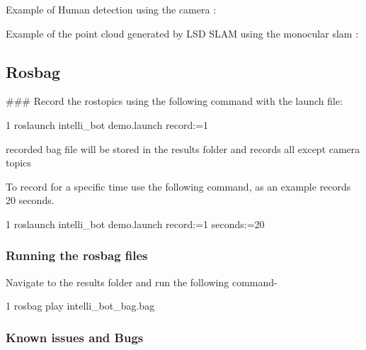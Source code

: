 Example of Human detection using the camera \+: 

Example of the point cloud generated by L\+SD S\+L\+AM using the monocular slam \+: 

\subsection*{Rosbag}

\#\#\# Record the rostopics using the following command with the launch file\+: 
\begin{DoxyCode}
1 roslaunch intelli\_bot demo.launch record:=1
\end{DoxyCode}


recorded bag file will be stored in the results folder and records all except camera topics

To record for a specific time use the following command, as an example records 20 seconds. 
\begin{DoxyCode}
1 roslaunch intelli\_bot demo.launch record:=1 seconds:=20
\end{DoxyCode}


\subsubsection*{Running the rosbag files}

Navigate to the results folder and run the following command-\/ 
\begin{DoxyCode}
1 rosbag play intelli\_bot\_bag.bag
\end{DoxyCode}


\subsubsection*{Known issues and Bugs}